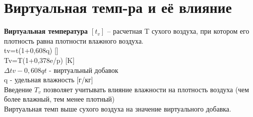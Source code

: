 
\section{Виртуальная темп-ра и её влияние}
\textbf{Виртуальная температура $[t_v]$} – расчетная T сухого воздуха, при котором его плотность равна плотности влажного воздуха.\\
tv=t(1+0,608q) [\celsius]\\
Tv=T(1+0,378e/p) [K]\\
$\varDelta tv-0,608qt$ - виртуальный добавок\\
q - удельная влажность [г/кг]\\
Введение $T_v$ позволяет учитывать влияние влажности на плотность воздуха (чем более влажный, тем менее плотный)\\
Виртуальная темп выше сухого воздуха на значение виртуального добавка.